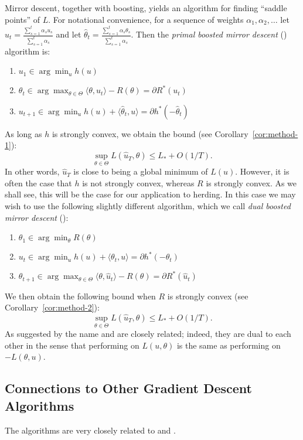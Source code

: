 \documentclass[paper.tex]{subfiles}
\begin{document}
Mirror descent, together with boosting, yields an algorithm for finding 
``saddle points'' of $L$. 
For notational convenience, for a sequence of weights $\alpha_1,\alpha_2,\ldots$ 
let $\hat{u}_t = \frac{\sum_{s=1}^t \alpha_su_s}{\sum_{s=1}^t \alpha_s}$ and let 
$\hat{\theta}_t = \frac{\sum_{s=1}^t \alpha_s\theta_s}{\sum_{s=1}^t \alpha_s}$. Then 
the {\em primal boosted mirror descent} (\primal) algorithm is:
\begin{enumerate}
\item $u_1 \in \arg\min_u h(u)$
\item $\theta_{t} \in \arg\max_{\theta \in \Theta} \langle \theta, u_t \rangle - R(\theta) = \partial R^{*}(u_{t})$
\item $u_{t+1} \in \arg\min_{u} h(u) + \langle \hat{\theta}_t, u \rangle = \partial h^{*}(-\hat\theta_{t})$
\end{enumerate}
As long as $h$ is strongly convex, we obtain the 
bound (see Corollary~\ref{cor:method-1}):
\begin{equation}
\sup_{\theta \in \Theta} L(\hat{u}_T, \theta) \leq L_{*} + O(1/T).
\end{equation}
In other words, $\hat{u}_T$ is close to being a global minimum of $L(u)$.
However, it is often the case that $h$ is not strongly convex, whereas $R$ is strongly convex. As we shall see, this will be the case for our application to herding.
In this case we may wish to use the following slightly different algorithm, which we call {\em dual boosted mirror descent} (\dual):
\begin{enumerate}
\item $\theta_1 \in \arg\min_{\theta} R(\theta)$
\item $u_t \in \arg\min_{u} h(u) + \langle \theta_t, u \rangle = \partial h^{*}(-\theta_{t})$
\item $\theta_{t+1} \in \arg\max_{\theta \in \Theta} \langle \theta, \hat{u}_t \rangle - R(\theta) = \partial R^{*}(\hat u_{t})$
\end{enumerate}
We then obtain the following bound 
when $R$ is strongly convex (see Corollary~\ref{cor:method-2}):
\[ \sup_{\theta \in \Theta} L(\hat{u}_T, \theta) \leq L_{*} + O(1/T). \]
As suggested by the name \primal and \dual are closely related; indeed, they are dual to each other in the sense that 
performing \primal on $L(u,\theta)$ is the same as performing \dual on 
$-L(\theta,u)$.


\subsection{Connections to Other Gradient Descent Algorithms}

The \bmd algorithms are very closely related to \cgd and \md. 
\end{document}
